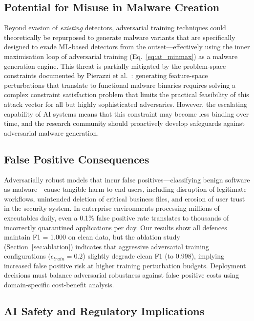 \documentclass[conference]{IEEEtran}
\begin{document}
\subsection{Potential for Misuse in Malware Creation}

Beyond evasion of \emph{existing} detectors, adversarial training techniques could theoretically be repurposed to generate malware variants that are specifically designed to evade ML-based detectors from the outset---effectively using the inner maximisation loop of adversarial training (Eq.~\ref{eq:at_minmax}) as a malware generation engine. This threat is partially mitigated by the problem-space constraints documented by Pierazzi et al.\ \cite{pierazzi2020}: generating feature-space perturbations that translate to functional malware binaries requires solving a complex constraint satisfaction problem that limits the practical feasibility of this attack vector for all but highly sophisticated adversaries. However, the escalating capability of AI systems means that this constraint may become less binding over time, and the research community should proactively develop safeguards against adversarial malware generation.

\subsection{False Positive Consequences}

Adversarially robust models that incur false positives---classifying benign software as malware---cause tangible harm to end users, including disruption of legitimate workflows, unintended deletion of critical business files, and erosion of user trust in the security system. In enterprise environments processing millions of executables daily, even a 0.1\% false positive rate translates to thousands of incorrectly quarantined applications per day. Our results show all defences maintain F1 = 1.000 on clean data, but the ablation study (Section~\ref{sec:ablation}) indicates that aggressive adversarial training configurations ($\epsilon_{train} = 0.2$) slightly degrade clean F1 (to 0.998), implying increased false positive risk at higher training perturbation budgets. Deployment decisions must balance adversarial robustness against false positive costs using domain-specific cost-benefit analysis.

\subsection{AI Safety and Regulatory Implications}
\end{document}
